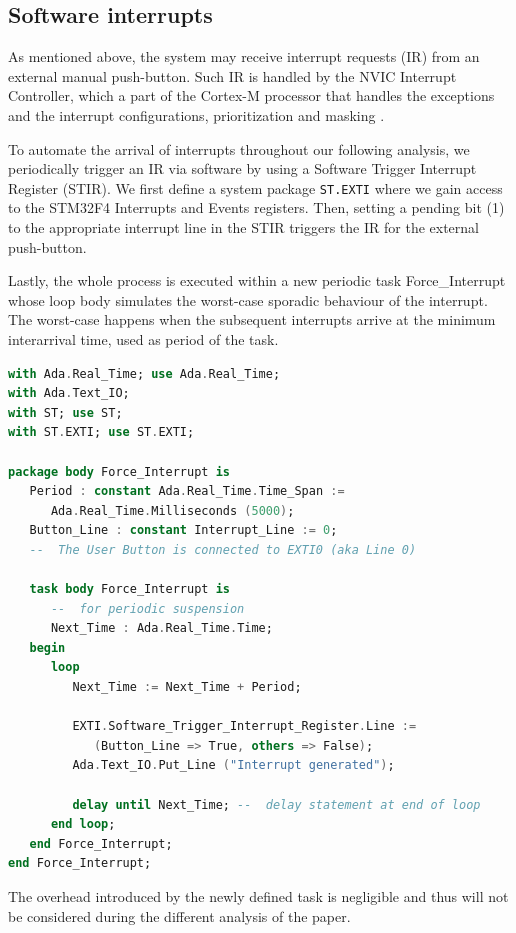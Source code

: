 \documentclass{article}
\begin{document}
\subsection{Software interrupts}
As mentioned above, the system may receive interrupt requests (IR) from an external manual push-button. Such IR is handled by the NVIC Interrupt Controller, which a part of the Cortex-M processor that handles the exceptions and the interrupt configurations, prioritization and masking \cite{arm}.

To automate the arrival of interrupts throughout our following analysis, we periodically trigger an IR via software by using a Software Trigger Interrupt Register (STIR). We first define a system package \texttt{ST.EXTI} where we gain access to the STM32F4 Interrupts and Events registers. Then, setting a pending bit (1) to the appropriate interrupt line in the STIR triggers the IR for the external push-button.

Lastly, the whole process is executed within a new periodic task Force\_Interrupt whose loop body simulates the worst-case sporadic behaviour of the interrupt. The worst-case happens when the subsequent interrupts arrive at the minimum interarrival time, used as period of the task.

\begin{lstlisting}[language=Ada]
with Ada.Real_Time; use Ada.Real_Time;
with Ada.Text_IO;
with ST; use ST;
with ST.EXTI; use ST.EXTI;

package body Force_Interrupt is
   Period : constant Ada.Real_Time.Time_Span :=
      Ada.Real_Time.Milliseconds (5000);
   Button_Line : constant Interrupt_Line := 0;
   --  The User Button is connected to EXTI0 (aka Line 0)

   task body Force_Interrupt is
      --  for periodic suspension
      Next_Time : Ada.Real_Time.Time;
   begin
      loop
         Next_Time := Next_Time + Period;

         EXTI.Software_Trigger_Interrupt_Register.Line :=
            (Button_Line => True, others => False);
         Ada.Text_IO.Put_Line ("Interrupt generated");

         delay until Next_Time; --  delay statement at end of loop
      end loop;
   end Force_Interrupt;
end Force_Interrupt;
\end{lstlisting}

The overhead introduced by the newly defined task is negligible and thus will not be considered during the different analysis of the paper.
\end{document}

